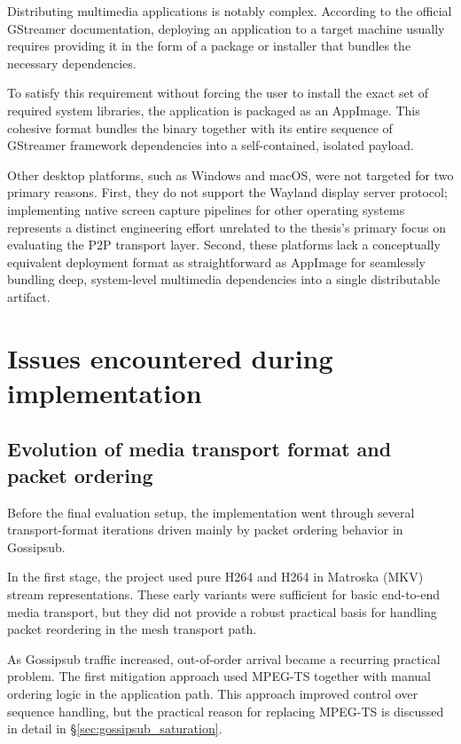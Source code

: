Distributing multimedia applications is notably complex. According to the official GStreamer documentation, deploying an application to a target machine usually requires providing it in the form of a package or installer that bundles the necessary dependencies.~\cite{gstreamerDeployingApplication2026}

To satisfy this requirement without forcing the user to install the exact set of required system libraries, the application is packaged as an AppImage. This cohesive format bundles the binary together with its entire sequence of GStreamer framework dependencies into a self-contained, isolated payload.

Other desktop platforms, such as Windows and macOS, were not targeted for two primary reasons. First, they do not support the Wayland display server protocol; implementing native screen capture pipelines for other operating systems represents a distinct engineering effort unrelated to the thesis's primary focus on evaluating the \ac{P2P} transport layer. Second, these platforms lack a conceptually equivalent deployment format as straightforward as AppImage for seamlessly bundling deep, system-level multimedia dependencies into a single distributable artifact.

\section{Issues encountered during implementation}
\subsection{Evolution of media transport format and packet ordering}
\label{sec:transport_format_evolution}
Before the final evaluation setup, the implementation went through several transport-format iterations driven mainly by packet ordering behavior in Gossipsub.

In the first stage, the project used pure H264 and H264 in Matroska (MKV) stream representations. These early variants were sufficient for basic end-to-end media transport, but they did not provide a robust practical basis for handling packet reordering in the mesh transport path.

As Gossipsub traffic increased, out-of-order arrival became a recurring practical problem. The first mitigation approach used MPEG-TS together with manual ordering logic in the application path. This approach improved control over sequence handling, but the practical reason for replacing MPEG-TS is discussed in detail in \S\ref{sec:gossipsub_saturation}.

